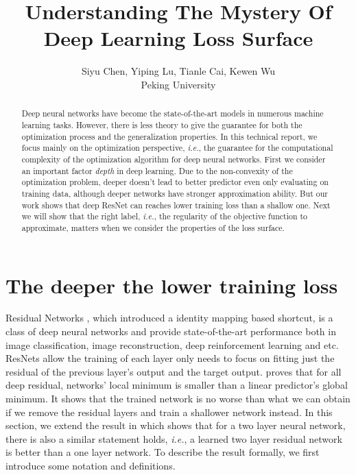 \documentclass{article}
\title{Understanding The Mystery Of Deep Learning Loss Surface}
\author{
	Siyu Chen, Yiping Lu, Tianle Cai, Kewen Wu\\
Peking University
}
\theoremstyle{plain}
\theoremstyle{definition}
\begin{document}

\maketitle

\begin{abstract}
Deep neural networks have become the state-of-the-art
models in numerous machine learning
tasks. However, there is less theory to give the guarantee for both the optimization process and the generalization properties. In this technical report, we focus mainly on the optimization perspective, \emph{i.e.}, the guarantee for the computational complexity of the optimization algorithm for deep neural networks. First we consider an important factor \emph{depth} in deep learning. Due to the non-convexity of the optimization problem, deeper doesn't lead to better predictor even only evaluating on training data, although deeper networks have stronger approximation ability. But our work shows that deep ResNet can reaches lower training loss than a shallow one. Next we will show that the right label, \emph{i.e.}, the regularity of the objective function to approximate, matters when we consider the properties of the loss surface. 

\end{abstract}

\section{The deeper the lower training loss}

Residual Networks \cite{he2016deep,he2016identity}, which introduced a identity mapping based shortcut, is a class of deep neural networks and provide state-of-the-art performance both in image classification\cite{he2016deep,he2016identity}, image reconstruction\cite{he2016deep}, deep reinforcement learning\cite{silver2017mastering} and etc. ResNets allow the training of each layer only needs to focus on fitting just the residual of the previous layer’s output and the target output. \cite{2018arXiv180406739S} proves that for all deep residual, networks' local minimum is smaller than a linear predictor's global minimum. It shows that the trained network is no worse than what we can obtain if we remove the
residual layers and train a shallower network instead. In this section, we extend the result in \cite{2018arXiv180406739S} which shows that for a two layer neural network, there is also a similar statement holds, \emph{i.e.}, a learned two layer residual network is better than a one layer network. To describe the result formally, we first introduce some notation and definitions. 
\end{document}
